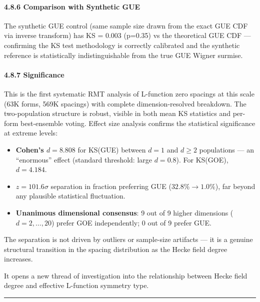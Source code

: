 \documentclass[
]{article}
\providecommand{\tightlist}{%
  \setlength{\itemsep}{0pt}\setlength{\parskip}{0pt}}
\begin{document}
\hypertarget{comparison-with-synthetic-gue}{%
\paragraph{4.8.6 Comparison with Synthetic
GUE}\label{comparison-with-synthetic-gue}}

The synthetic GUE control (same sample size drawn from the exact GUE CDF
via inverse transform) has KS = 0.003 (p=0.35) vs the theoretical GUE
CDF --- confirming the KS test methodology is correctly calibrated and
the synthetic reference is statistically indistinguishable from the true
GUE Wigner surmise.

\hypertarget{significance}{%
\paragraph{4.8.7 Significance}\label{significance}}

This is the first systematic RMT analysis of L-function zero spacings at
this scale (63K forms, 569K spacings) with complete dimension-resolved
breakdown. The two-population structure is robust, visible in both mean
KS statistics and per-form best-ensemble voting. Effect size analysis
confirms the statistical significance at extreme levels:

\begin{itemize}
\tightlist
\item
  \textbf{Cohen's \(d = 8.808\)} for KS(GUE) between \(d=1\) and
  \(d\ge 2\) populations --- an ``enormous'' effect (standard threshold:
  large \(d=0.8\)). For KS(GOE), \(d = 4.184\).
\item
  \textbf{\(z = 101.6\sigma\)} separation in fraction preferring GUE
  (\(32.8\% \to 1.0\%\)), far beyond any plausible statistical
  fluctuation.
\item
  \textbf{Unanimous dimensional consensus}: 9 out of 9 higher dimensions
  (\(d=2,\dots,20\)) prefer GOE independently; 0 out of 9 prefer GUE.
\end{itemize}

The separation is not driven by outliers or sample-size artifacts --- it
is a genuine structural transition in the spacing distribution as the
Hecke field degree increases.

It opens a new thread of investigation into the relationship between
Hecke field degree and effective L-function symmetry type.

\begin{center}\rule{0.5\linewidth}{0.5pt}\end{center}
\end{document}
